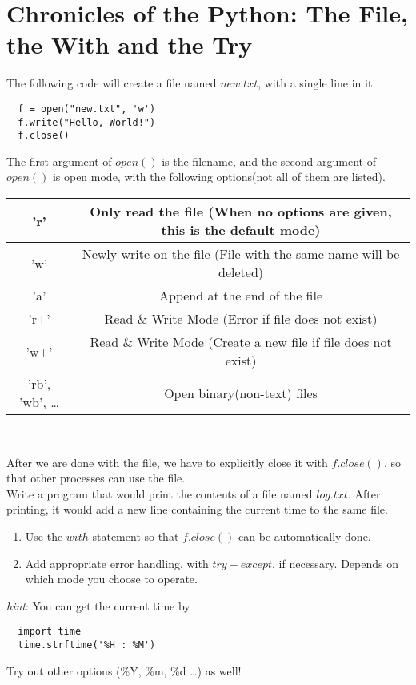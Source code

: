 \documentclass{article}
\begin{document}
\thispagestyle{fancy}
\setcounter{section}{-1}

\section{Chronicles of the Python: The File, the With and the Try}
The following code will create a file named $new.txt$, with a single line in
it. 
\begin{lstlisting}
  f = open("new.txt", 'w')
  f.write("Hello, World!")
  f.close()
\end{lstlisting}
The first argument of $open()$ is the filename, and the second argument of
$open()$ is open mode, with the following options(not all of them are listed).\\
\begin{center}
  \begin{tabular}{*2c}
    \hline
    'r' & Only read the file (When no options are given, this is the default mode)\\ \hline
    'w' & Newly write on the file (File with the same name will be
    deleted)\\ \hline
    'a' & Append at the end of the file\\ \hline
    'r+' & Read \& Write Mode (Error if file does not exist)\\ \hline
    'w+' & Read \& Write Mode (Create a new file if file does not exist)\\ \hline
    'rb', 'wb', \ldots & Open binary(non-text) files \\ \hline
  \end{tabular}\\
\end{center}
  After we are done with the file, we have to explicitly close it with
  $f.close()$, so that other processes can use the file.\\

  Write a program that would print the contents of a file named $log.txt$.
  After printing, it would add a new line containing the current time to the
  same file.
  \begin{enumerate}
    \item  Use the $with$ statement so that $f.close()$ can be automatically done. 
    \item Add appropriate error handling, with $try-except$, if necessary. Depends on which mode you
      choose to operate.
  \end{enumerate}
    \textit{hint}: You can get the current time by
    \begin{lstlisting}
  import time
  time.strftime('%H : %M')
    \end{lstlisting}
    Try out other options (\%Y, \%m, \%d \ldots) as well!
\end{document}
